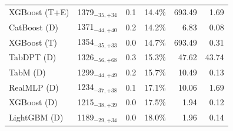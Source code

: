 \begin{tabular}{llccrr}
XGBoost (T+E) & 1379${}_{-35,+34}$ & 0.1 & 14.4\% & 693.49 & 1.69 \\
CatBoost (D) & 1371${}_{-44,+40}$ & 0.2 & 14.2\% & 6.83 & 0.08 \\
XGBoost (T) & 1354${}_{-35,+33}$ & 0.0 & 14.7\% & 693.49 & 0.31 \\
TabDPT (D) & 1326${}_{-56,+68}$ & 0.3 & 15.3\% & 47.62 & 43.74 \\
TabM (D) & 1299${}_{-44,+49}$ & 0.2 & 15.7\% & 10.49 & 0.13 \\
RealMLP (D) & 1234${}_{-37,+38}$ & 0.1 & 17.1\% & 10.06 & 1.69 \\
XGBoost (D) & 1215${}_{-38,+39}$ & 0.0 & 17.5\% & 1.94 & 0.12 \\
LightGBM (D) & 1189${}_{-29,+34}$ & 0.0 & 18.0\% & 1.96 & 0.14 \\
\bottomrule
\end{tabular}

